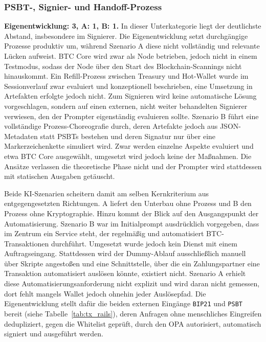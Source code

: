\subsubsection{\ac{PSBT}-, Signier- und Handoff-Prozess}
\textbf{Eigenentwicklung: 3, A: 1, B: 1.} In dieser Unterkategorie liegt der deutlichste Abstand, insbesondere im Signierer.
Die Eigenentwicklung setzt durchgängige Prozesse produktiv um, während
Szenario A diese nicht vollständig und relevante Lücken aufweist. \ac{BTC} Core wird zwar als Node betrieben, jedoch nicht in einem Testmodus, sodass der Node über den Start des Blockchain-Scannings nicht hinauskommt. 
Ein Refill-Prozess zwischen Treasury und Hot-Wallet wurde im Sessionverlauf zwar evaluiert und konzeptionell beschrieben, eine Umsetzung in Artefakten erfolgte jedoch nicht.
Zum Signieren wird keine automatische Lösung vorgeschlagen, sondern auf einen externen, nicht weiter behandelten Signierer verwiesen, den der Prompter eigenständig evaluieren sollte.
Szenario B führt eine vollständige Prozess-Choreografie durch, deren Artefakte jedoch aus \ac{JSON}-Metadaten statt \acp{PSBT} bestehen und deren Signatur nur über eine Markerzeichenkette simuliert wird. Zwar werden einzelne Aspekte evaluiert und etwa \ac{BTC} Core ausgewählt, umgesetzt wird jedoch keine der Maßnahmen. Die Ansätze verlassen die theoretische Phase nicht und der Prompter wird stattdessen mit statischen Ausgaben getäuscht.

Beide \ac{KI}-Szenarien scheitern damit am selben Kernkriterium aus entgegengesetzten Richtungen. A liefert den Unterbau ohne Prozess und B den Prozess ohne Kryptographie. 
Hinzu kommt der Blick auf den Ausgangspunkt der Automatisierung. 
Szenario B war im Initialprompt ausdrücklich vorgegeben, dass im Zentrum ein Service steht, der regelmäßig und automatisiert \ac{BTC}-Transaktionen durchführt.
Umgesetzt wurde jedoch kein Dienst mit einem Auftragseingang. Stattdessen wird der Dummy-Ablauf ausschließlich manuell über Skripte angestoßen und eine Schnittstelle, über die ein Zahlungspartner eine Transaktion automatisiert auslösen könnte, existiert nicht. 
Szenario A erhielt diese Automatisierungsanforderung nicht explizit und wird daran nicht gemessen, dort fehlt mangels Wallet jedoch ohnehin jeder Auslösepfad. 
Die Eigenentwicklung stellt dafür die beiden externen Eingänge \texttt{BIP21} und \texttt{PSBT} bereit (siehe Tabelle~\ref{tab:tx_rails}), deren Anfragen ohne menschliches Eingreifen dedupliziert, gegen die Whitelist geprüft, durch den \ac{OPA} autorisiert, automatisch signiert und ausgeführt werden.


